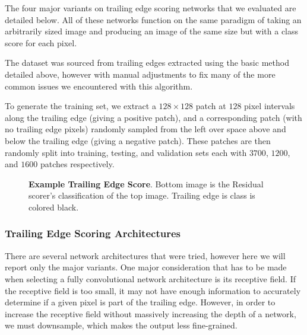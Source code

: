 The four major variants on trailing edge scoring networks that we evaluated are detailed below.
All of these networks function on the same paradigm of taking an arbitrarily sized image and producing an image of the same size but with a class score for each pixel.

The dataset was sourced from trailing edges extracted using the basic method detailed above, however with manual adjustments to fix many of the more common issues we encountered with this algorithm.

To generate the training set, we extract a $128 \times 128$ patch at $128$ pixel intervals along the trailing edge (giving a positive patch), and a corresponding patch (with no trailing edge pixels) randomly sampled from the left over space above and below the trailing edge (giving a negative patch).
These patches are then randomly split into training, testing, and validation sets each with $3700$, $1200$, and $1600$ patches respectively.

\begin{figure}[t]%
\centering
{}
\newline
{}
\caption[]{\textbf{Example Trailing Edge Score}. Bottom image is the Residual scorer's classification of the top image. Trailing edge is class is colored black.}
\label{fig:example_te_score_annotres}
\end{figure}



\subsubsection{Trailing Edge Scoring Architectures} 
\label{sec:te_arch}

There are several network architectures that were tried, however here we will report only the major variants.
One major consideration that has to be made when selecting a fully convolutional network architecture is its receptive field.
If the receptive field is too small, it may not have enough information to accurately determine if a given pixel is part of the trailing edge.
However, in order to increase the receptive field without massively increasing the depth of a network, we must downsample, which makes the output less fine-grained.

